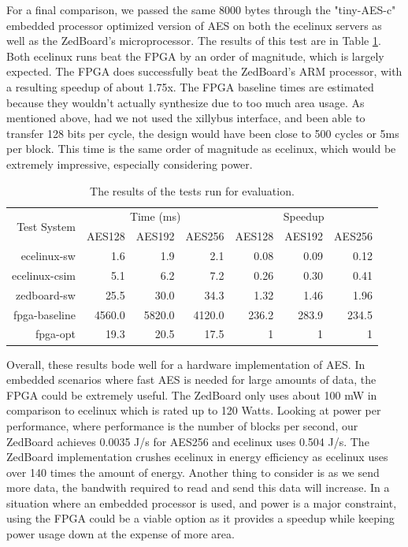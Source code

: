 For a final comparison, we passed the same 8000 bytes through the "tiny-AES-c" embedded processor optimized version of AES on both the ecelinux servers as well as the ZedBoard's microprocessor. The results of this test are in Table \ref{table:aestime}. Both ecelinux runs beat the FPGA by an order of magnitude, which is largely expected. The FPGA does successfully beat the ZedBoard's ARM processor, with a resulting speedup of about 1.75x. The FPGA baseline times are estimated because they wouldn't actually synthesize due to too much area usage.
As mentioned above, had we not used the xillybus interface, and been able to transfer 128 bits per cycle, the design would have been close to 500 cycles or 5ms per block.
This time is the same order of magnitude as ecelinux, which would be extremely impressive, especially considering power.

\begin{table}[h]
\begin{center}
\begin{tabular}{@{}r r r r r r r@{}}
\toprule
\multirow{2}{*}{Test System} & \multicolumn{3}{c}{Time (ms)} & \multicolumn{3}{c}{Speedup} \\ \cline{2-7}
              & AES128 & AES192 & AES256 & AES128 & AES192 & AES256 \\ \midrule
ecelinux-sw   & 1.6         & 1.9         & 2.1         & 0.08             & 0.09             & 0.12             \\
ecelinux-csim & 5.1         & 6.2         & 7.2         & 0.26             & 0.30             & 0.41             \\
zedboard-sw   & 25.5        & 30.0        & 34.3        & 1.32             & 1.46             & 1.96             \\
fpga-baseline & 4560.0      & 5820.0      & 4120.0      & 236.2            & 283.9            & 234.5            \\
fpga-opt      & 19.3        & 20.5        & 17.5        & 1                & 1                & 1                \\ \bottomrule
\end{tabular}
\label{table:aestime}
\caption{The results of the tests run for evaluation.}
\end{center}
\end{table}

Overall, these results bode well for a hardware implementation of AES. In embedded scenarios where fast AES is needed for large amounts of data, the FPGA could be extremely useful. The ZedBoard only uses about 100 mW in comparison to ecelinux which is rated up to 120 Watts. Looking at power per performance, where performance is the number of blocks per second, our ZedBoard achieves 0.0035 J/s for AES256 and ecelinux uses 0.504 J/s. The ZedBoard implementation crushes ecelinux in energy efficiency as ecelinux uses over 140 times the amount of energy. Another thing to consider is as we send more data, the bandwith required to read and send this data will increase. In a situation where an embedded processor is used, and power is a major constraint, using the FPGA could be a viable option as it provides a speedup while keeping power usage down at the expense of more area.
